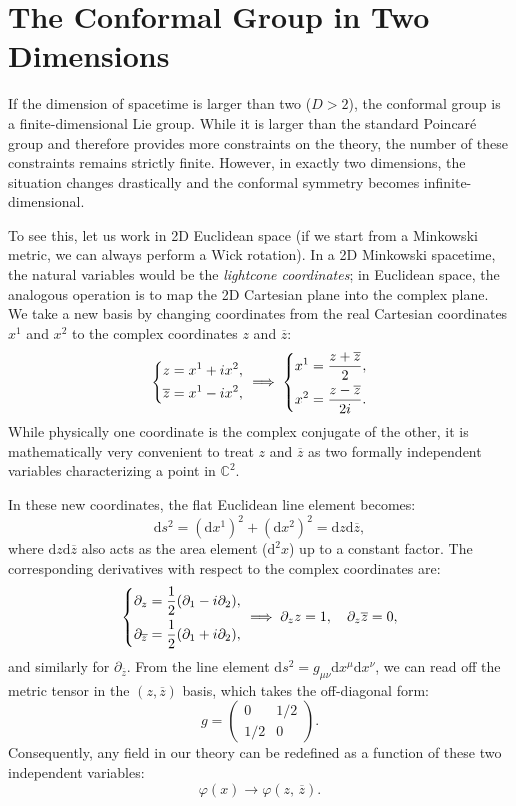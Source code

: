 \section{The Conformal Group in Two Dimensions}

If the dimension of spacetime is larger than two (\(D>2\)), the conformal group is a finite-dimensional Lie group. While it is larger than the standard Poincar\'e group and therefore provides more constraints on the theory, the number of these constraints remains strictly finite. However, in exactly two dimensions, the situation changes drastically and the conformal symmetry becomes infinite-dimensional.

To see this, let us work in 2D Euclidean space (if we start from a Minkowski metric, we can always perform a Wick rotation). In a 2D Minkowski spacetime, the natural variables would be the \textit{lightcone coordinates}; in Euclidean space, the analogous operation is to map the 2D Cartesian plane into the complex plane.
We take a new basis by changing coordinates from the real Cartesian coordinates \(x^1\) and \(x^2\) to the complex coordinates \(z\) and \(\overline{z}\):
\[
    \begin{dcases}
        z = x^1 + i x^2, \\
        \overline{z} = x^1 - i x^2,
    \end{dcases} \implies \begin{dcases}
        x^1 = \frac{z + \overline{z}}{2}, \\
        x^2 = \frac{z - \overline{z}}{2i}.
    \end{dcases}
\]
While physically one coordinate is the complex conjugate of the other, it is mathematically very convenient to treat \(z\) and \(\overline{z}\) as two formally independent variables characterizing a point in \(\mathbb{C}^2\).

In these new coordinates, the flat Euclidean line element becomes:
\[
    \mathrm{d} s^2 = (\mathrm{d} x^1)^2 + (\mathrm{d} x^2)^2 = \mathrm{d} z \mathrm{d} \overline{z},
\]
where \(\mathrm{d} z \mathrm{d} \overline{z}\) also acts as the area element (\(\mathrm{d}^2 x\)) up to a constant factor. The corresponding derivatives with respect to the complex coordinates are:
\[
    \begin{dcases}
        \partial_z = \frac{1}{2}(\partial_1 - i \partial_2), \\
        \partial_{\overline{z}} = \frac{1}{2}(\partial_1 + i \partial_2),
    \end{dcases} \implies \partial_z z = 1, \quad \partial_z \overline{z} = 0,
\]
and similarly for \(\partial_{\overline{z}}\). From the line element \(\mathrm{d}s^2 = g_{\mu\nu}\mathrm{d}x^\mu \mathrm{d}x^\nu\), we can read off the metric tensor in the \((z, \overline{z})\) basis, which takes the off-diagonal form:
\[
    g = \begin{pmatrix}
        0     & 1 / 2 \\
        1 / 2 & 0
    \end{pmatrix}.
\]
Consequently, any field in our theory can be redefined as a function of these two independent variables:
\[
    \varphi(x) \to \varphi(z, \, \overline{z}).
\]

